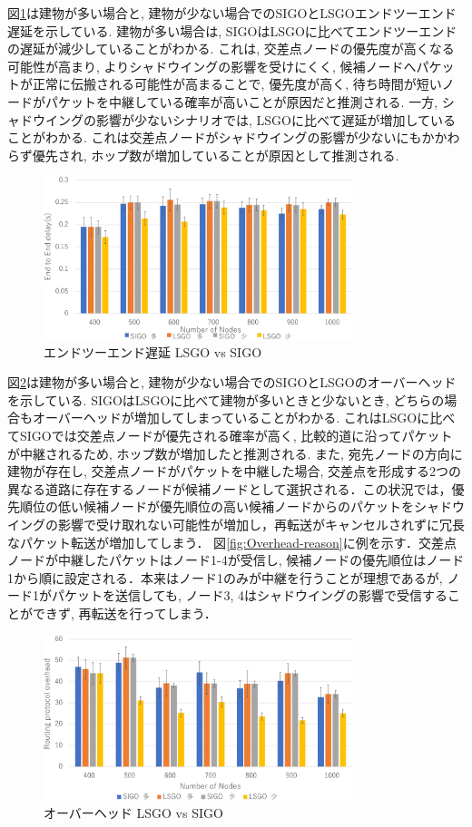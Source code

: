 \documentclass[technicalreport]{ieicej}
\begin{document}
 図\ref{fig:Delay}は建物が多い場合と, 建物が少ない場合でのSIGOとLSGOエンドツーエンド遅延を示している. 建物が多い場合は, SIGOはLSGOに比べてエンドツーエンドの遅延が減少していることがわかる. これは, 交差点ノードの優先度が高くなる可能性が高まり, よりシャドウイングの影響を受けにくく, 候補ノードへパケットが正常に伝搬される可能性が高まることで, 優先度が高く, 待ち時間が短いノードがパケットを中継している確率が高いことが原因だと推測される. 一方, シャドウイングの影響が少ないシナリオでは, LSGOに比べて遅延が増加していることがわかる. これは交差点ノードがシャドウイングの影響が少ないにもかかわらず優先され, ホップ数が増加していることが原因として推測される. 
 
 \begin{figure}[!ht]
\centering
\includegraphics[width=90mm]{figures/Delay.eps}
\caption{エンドツーエンド遅延 LSGO vs SIGO}
\label{fig:Delay}
\end{figure}

図\ref{fig:Overhead}は建物が多い場合と, 建物が少ない場合でのSIGOとLSGOのオーバーヘッドを示している. SIGOはLSGOに比べて建物が多いときと少ないとき, どちらの場合もオーバーヘッドが増加してしまっていることがわかる. これはLSGOに比べてSIGOでは交差点ノードが優先される確率が高く, 比較的道に沿ってパケットが中継されるため, ホップ数が増加したと推測される. また, 宛先ノードの方向に建物が存在し, 交差点ノードがパケットを中継した場合, 交差点を形成する2つの異なる道路に存在するノードが候補ノードとして選択される．この状況では，優先順位の低い候補ノードが優先順位の高い候補ノードからのパケットをシャドウイングの影響で受け取れない可能性が増加し，再転送がキャンセルされずに冗長なパケット転送が増加してしまう． 図\ref{fig:Overhead-reason}に例を示す．交差点ノードが中継したパケットはノード1-4が受信し, 候補ノードの優先順位はノード1から順に設定される．本来はノード1のみが中継を行うことが理想であるが, ノード1がパケットを送信しても, ノード3, 4はシャドウイングの影響で受信することができず, 再転送を行ってしまう．

 \begin{figure}[!ht]
\centering
\includegraphics[width=90mm]{figures/Overhead.eps}
\caption{オーバーヘッド LSGO vs SIGO}
\label{fig:Overhead}
\end{figure}
\end{document}
